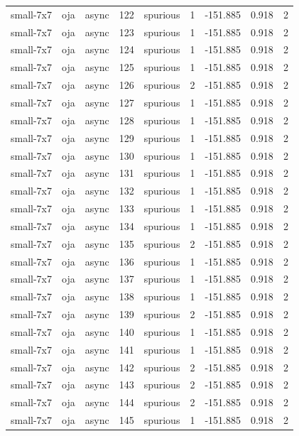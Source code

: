 \begin{tabular}{lllrlrrrr}
small-7x7 & oja & async & 122 & spurious & 1 & -151.885 & 0.918 & 2 \\
small-7x7 & oja & async & 123 & spurious & 1 & -151.885 & 0.918 & 2 \\
small-7x7 & oja & async & 124 & spurious & 1 & -151.885 & 0.918 & 2 \\
small-7x7 & oja & async & 125 & spurious & 1 & -151.885 & 0.918 & 2 \\
small-7x7 & oja & async & 126 & spurious & 2 & -151.885 & 0.918 & 2 \\
small-7x7 & oja & async & 127 & spurious & 1 & -151.885 & 0.918 & 2 \\
small-7x7 & oja & async & 128 & spurious & 1 & -151.885 & 0.918 & 2 \\
small-7x7 & oja & async & 129 & spurious & 1 & -151.885 & 0.918 & 2 \\
small-7x7 & oja & async & 130 & spurious & 1 & -151.885 & 0.918 & 2 \\
small-7x7 & oja & async & 131 & spurious & 1 & -151.885 & 0.918 & 2 \\
small-7x7 & oja & async & 132 & spurious & 1 & -151.885 & 0.918 & 2 \\
small-7x7 & oja & async & 133 & spurious & 1 & -151.885 & 0.918 & 2 \\
small-7x7 & oja & async & 134 & spurious & 1 & -151.885 & 0.918 & 2 \\
small-7x7 & oja & async & 135 & spurious & 2 & -151.885 & 0.918 & 2 \\
small-7x7 & oja & async & 136 & spurious & 1 & -151.885 & 0.918 & 2 \\
small-7x7 & oja & async & 137 & spurious & 1 & -151.885 & 0.918 & 2 \\
small-7x7 & oja & async & 138 & spurious & 1 & -151.885 & 0.918 & 2 \\
small-7x7 & oja & async & 139 & spurious & 2 & -151.885 & 0.918 & 2 \\
small-7x7 & oja & async & 140 & spurious & 1 & -151.885 & 0.918 & 2 \\
small-7x7 & oja & async & 141 & spurious & 1 & -151.885 & 0.918 & 2 \\
small-7x7 & oja & async & 142 & spurious & 2 & -151.885 & 0.918 & 2 \\
small-7x7 & oja & async & 143 & spurious & 2 & -151.885 & 0.918 & 2 \\
small-7x7 & oja & async & 144 & spurious & 2 & -151.885 & 0.918 & 2 \\
small-7x7 & oja & async & 145 & spurious & 1 & -151.885 & 0.918 & 2 \\

\end{tabular}
